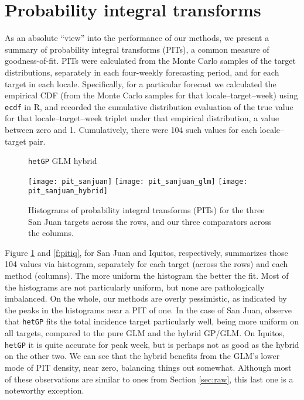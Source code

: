 \documentclass[12pt]{article}
\begin{document}
%


\section{Probability integral transforms}
\label{sec:pit}

As an absolute ``view'' into the performance of our methods, we present a
summary of probability integral transforms (PITs), a common measure of
goodness-of-fit.  PITs were calculated from the Monte Carlo samples of the
target distributions, separately in each four-weekly forecasting period, and
for each target in each locale.  Specifically, for a particular forecast we
calculated the empirical CDF (from the Monte Carlo samples for that
locale--target--week) using {\tt ecdf} in {\sf R}, and recorded the cumulative
distribution evaluation of the true value for that locale--target--week
triplet under that empirical distribution, a value between zero and
1. Cumulatively, there were 104 such values for each locale--target pair.

\begin{figure}[ht!]
\centering
\hspace{3cm} {\tt hetGP} \hfill GLM \hfill hybrid \hspace{3cm}

\texttt{[image: pit\_sanjuan]}
\texttt{[image: pit\_sanjuan\_glm]}
\texttt{[image: pit\_sanjuan\_hybrid]}
\caption{Histograms of probability integral transforms (PITs) for the three
San Juan targets across the rows, and our three comparators across the columns.}
\label{f:pitsj}
\end{figure}  

Figure \ref{f:pitsj} and \ref{f:pitiq}, for San Juan and Iquitos,
respectively, summarizes those 104 values via histogram, separately for each
target (across the rows) and each method (columns).  The more uniform the
histogram the better the fit.  Most of the histograms are not particularly
uniform, but none are pathologically imbalanced.  On the whole, our methods
are overly pessimistic, as indicated by the peaks in the histograms near a PIT
of one. In the case of San Juan, observe that {\tt hetGP} fits the total
incidence target particularly well, being more uniform on all targets,
compared to the pure GLM and the hybrid GP/GLM. On Iquitos, {\tt hetGP} it is
quite accurate for peak week, but is perhaps not as good as the hybrid on the
other two.  We can see that the hybrid benefits from the GLM's lower mode of
PIT density, near zero, balancing things out somewhat. Although most of these
observations are similar to ones from Section \ref{sec:raw}, this last one is
a noteworthy exception.  
\end{document}
